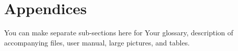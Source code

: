 \section*{Appendices} \label{appendices} 
You can make separate sub-sections here for Your glossary, description of accompanying files, user manual, large pictures, and tables.